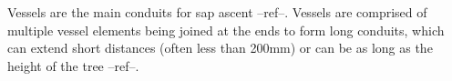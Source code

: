 Vessels are the main conduits for sap ascent --ref--. Vessels are comprised of
multiple vessel elements being joined at the ends to form long conduits, which
can extend short distances (often less than 200mm) or can be as long as the
height of the tree --ref--.